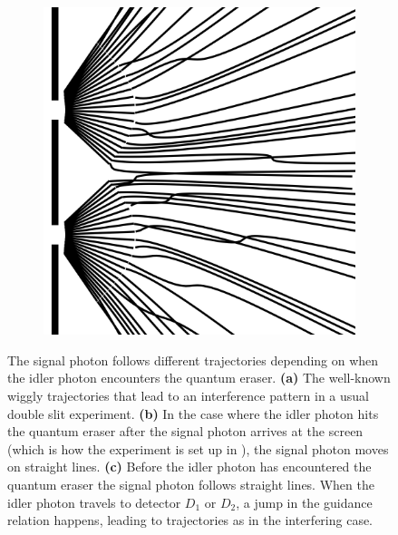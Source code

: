 \documentclass[11pt]{article}
\numberwithin{equation}{section}
\begin{document}
\begin{figure}[H]
\begin{subfigure}[b]{0.3\textwidth}
   				\caption{}
   				\label{fig:s2}
 		\end{subfigure}
		~
 		\begin{subfigure}[b]{0.3\textwidth}
   				\includegraphics[width=\textwidth]{eraser.png}
   				\caption{}
   				\label{fig:s3}
 		\end{subfigure}
 		
 
		\caption{The signal photon follows different trajectories depending on when the idler photon encounters the quantum eraser. \textbf{(a)} The well-known wiggly trajectories that lead to an interference pattern in a usual double slit experiment. \textbf{(b)} In the case where the idler photon hits the quantum eraser after the signal photon arrives at the screen (which is how the experiment is set up in \cite{Kim1999}), the signal photon moves on straight lines.  \textbf{(c)} Before the idler photon has encountered the quantum eraser the signal photon follows straight lines. When the idler photon travels to detector $D_1$ or $D_2$, a jump in the guidance relation happens, leading to trajectories as in the interfering case.}
		\label{fig:Doppelspalt}	
\end{figure} 
\end{document}
